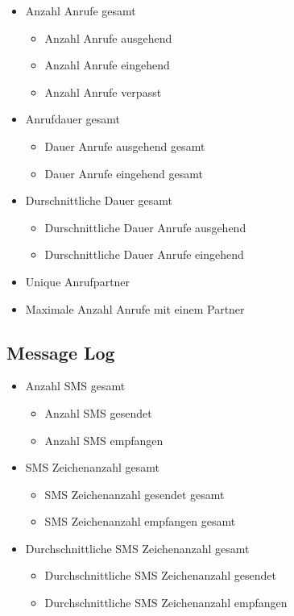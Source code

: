\begin{itemize}
    \item Anzahl Anrufe gesamt
    \begin{itemize}
        \item Anzahl Anrufe ausgehend
        \item Anzahl Anrufe eingehend
        \item Anzahl Anrufe verpasst
    \end{itemize}

    \item Anrufdauer gesamt
    \begin{itemize}
        \item Dauer Anrufe ausgehend gesamt
        \item Dauer Anrufe eingehend gesamt
    \end{itemize}

    \item Durschnittliche Dauer gesamt
    \begin{itemize}
        \item Durschnittliche Dauer Anrufe ausgehend
        \item Durschnittliche Dauer Anrufe eingehend
    \end{itemize}

    \item Unique Anrufpartner
    \item Maximale Anzahl Anrufe mit einem Partner

\end{itemize}

\subsection{Message Log}

\begin{itemize}
    \item Anzahl SMS gesamt
    \begin{itemize}
        \item Anzahl SMS gesendet
        \item Anzahl SMS empfangen
    \end{itemize}

    \item SMS Zeichenanzahl gesamt
    \begin{itemize}
        \item SMS Zeichenanzahl gesendet gesamt
        \item SMS Zeichenanzahl empfangen gesamt
    \end{itemize}

    \item Durchschnittliche SMS Zeichenanzahl gesamt
    \begin{itemize}
        \item Durchschnittliche SMS Zeichenanzahl gesendet
        \item Durchschnittliche SMS Zeichenanzahl empfangen
    \end{itemize}

\end{itemize}


